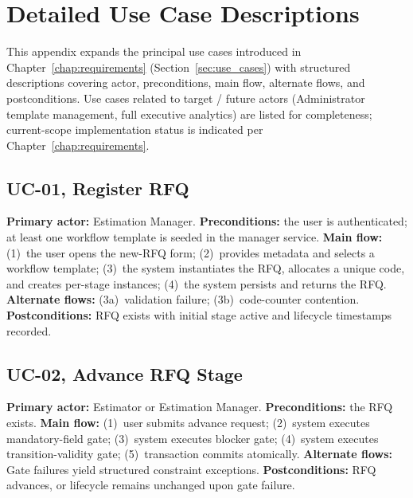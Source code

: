 \clearpage
\appendix
{}
{}
\markboth{}{}
\thispagestyle{MyStyle}
\makeatletter\renewcommand{}\makeatother
\setcounter{section}{0}
\renewcommand{\thefigure}{A.\arabic{figure}}
\setcounter{figure}{0}
\renewcommand{\thetable}{A.\arabic{table}}
\setcounter{table}{0}

\section{Detailed Use Case Descriptions}
\label{app:use-cases}

This appendix expands the principal use cases introduced in Chapter~\ref{chap:requirements} (Section~\ref{sec:use_cases}) with structured descriptions covering actor, preconditions, main flow, alternate flows, and postconditions. Use cases related to target / future actors (Administrator template management, full executive analytics) are listed for completeness; current-scope implementation status is indicated per Chapter~\ref{chap:requirements}.

\subsection{UC-01, Register RFQ}
\textbf{Primary actor:} Estimation Manager. \textbf{Preconditions:} the user is authenticated; at least one workflow template is seeded in the manager service. \textbf{Main flow:} (1)~the user opens the new-RFQ form; (2)~provides metadata and selects a workflow template; (3)~the system instantiates the RFQ, allocates a unique code, and creates per-stage instances; (4)~the system persists and returns the RFQ. \textbf{Alternate flows:} (3a)~validation failure; (3b)~code-counter contention. \textbf{Postconditions:} RFQ exists with initial stage active and lifecycle timestamps recorded.

\subsection{UC-02, Advance RFQ Stage}
\textbf{Primary actor:} Estimator or Estimation Manager. \textbf{Preconditions:} the RFQ exists. \textbf{Main flow:} (1)~user submits advance request; (2)~system executes mandatory-field gate; (3)~system executes blocker gate; (4)~system executes transition-validity gate; (5)~transaction commits atomically. \textbf{Alternate flows:} Gate failures yield structured constraint exceptions. \textbf{Postconditions:} RFQ advances, or lifecycle remains unchanged upon gate failure.

